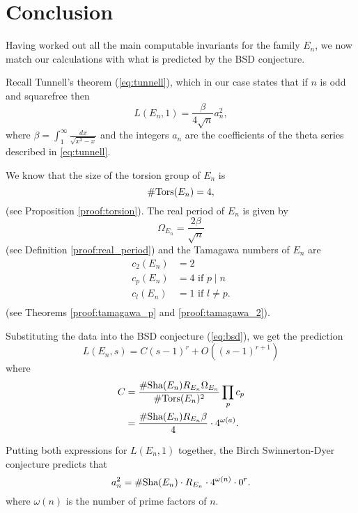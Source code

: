 \documentclass[12pt, a4paper]{report}
\begin{document}
\newpage

\chapter{Conclusion}
Having worked out all the main computable invariants
for the family $E_n$, we now match our calculations with what is predicted
by the BSD conjecture. 

Recall Tunnell's theorem (\autoref{eq:tunnell}), which in our case states that
if $n$ is odd and squarefree then
\[L(E_n,1) = \frac{\beta}{4\sqrt{n}}a_n^2,\]
where $\beta = \int_1^\infty \frac{dx}{\sqrt{x^3-x}}$ and the integers $a_n$
are the coefficients of the theta series described in \autoref{eq:tunnell}.

We know that the size of the torsion group of $E_n$ is 
\begin{equation*}
    \#{\text{\normalfont Tors}}(E_n) = 4,
  \end{equation*}
  (see Proposition \autoref{proof:torsion}).
  The real period of $E_n$ is given by {}
\begin{equation*}
  \Omega_{E_n} = \frac{2\beta}{\sqrt{n}} 
\end{equation*}
(see Definition \autoref{proof:real_period}) and the Tamagawa numbers of $E_n$ are
\begin{equation*}
  \begin{split}
    c_2(E_n) &= 2 \\
    c_p(E_n) &= 4 \text{ if } p \mid n \\
    c_l(E_n) &= 1 \text{ if } l \neq p. \\
  \end{split}
\end{equation*}
(see Theorems \autoref{proof:tamagawa_p} and \autoref{proof:tamagawa_2}).

Substituting the data into the BSD conjecture (\autoref{eq:bsd}), we get the prediction
\[
  L(E_n,s) = C(s-1)^r + O((s-1)^{r+1})
\]
where
\begin{equation*}
  \begin{split}
    C &=
    \frac{\# \text{\normalfont Sha}(E_n) R_{E_n} \Omega_{E_n}}{\# {\text{\normalfont Tors}}(E_n)^2}
    \prod\limits_p c_p \\
    &= \frac{\# \text{\normalfont Sha}(E_n) R_{E_n} \beta}{4} \cdot 4^{\omega(a)}.
  \end{split}
\end{equation*}

Putting both expressions for $L(E_n, 1)$ together, the Birch Swinnerton-Dyer conjecture
predicts that 
\begin{equation} \label{mainpred} 
  a_n^2 = \#\text{\normalfont Sha}(E_n) \cdot R_{E_n}\cdot 4^{\omega(n)} \cdot 0^r.
\end{equation}
where $\omega(n)$ is the number of prime factors of $n$.
\end{document}
